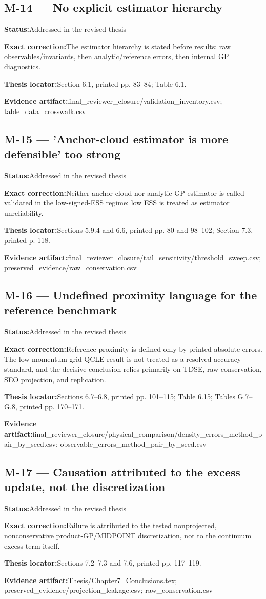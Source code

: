 \documentclass[11pt]{article}
\newcommand{\field}[2]{\textbf{#1}\quad #2\par}
\begin{document}
\subsection*{M-14 --- No explicit estimator hierarchy}
\field{Status:}{Addressed in the revised thesis}
\field{Exact correction:}{The estimator hierarchy is stated before results: raw observables/invariants, then analytic/reference errors, then internal GP diagnostics.}
\field{Thesis locator:}{Section 6.1, printed pp. 83--84; Table 6.1.}
\field{Evidence artifact:}{final\_reviewer\_closure/validation\_inventory.csv; table\_data\_crosswalk.csv}
\subsection*{M-15 --- 'Anchor-cloud estimator is more defensible' too strong}
\field{Status:}{Addressed in the revised thesis}
\field{Exact correction:}{Neither anchor-cloud nor analytic-GP estimator is called validated in the low-signed-ESS regime; low ESS is treated as estimator unreliability.}
\field{Thesis locator:}{Sections 5.9.4 and 6.6, printed pp. 80 and 98--102; Section 7.3, printed p. 118.}
\field{Evidence artifact:}{final\_reviewer\_closure/tail\_sensitivity/threshold\_sweep.csv; preserved\_evidence/raw\_conservation.csv}
\subsection*{M-16 --- Undefined proximity language for the reference benchmark}
\field{Status:}{Addressed in the revised thesis}
\field{Exact correction:}{Reference proximity is defined only by printed absolute errors. The low-momentum grid-QCLE result is not treated as a resolved accuracy standard, and the decisive conclusion relies primarily on TDSE, raw conservation, SEO projection, and replication.}
\field{Thesis locator:}{Sections 6.7--6.8, printed pp. 101--115; Table 6.15; Tables G.7--G.8, printed pp. 170--171.}
\field{Evidence artifact:}{final\_reviewer\_closure/physical\_comparison/density\_errors\_method\_pair\_by\_seed.csv; observable\_errors\_method\_pair\_by\_seed.csv}
\subsection*{M-17 --- Causation attributed to the excess update, not the discretization}
\field{Status:}{Addressed in the revised thesis}
\field{Exact correction:}{Failure is attributed to the tested nonprojected, nonconservative product-GP/MIDPOINT discretization, not to the continuum excess term itself.}
\field{Thesis locator:}{Sections 7.2--7.3 and 7.6, printed pp. 117--119.}
\field{Evidence artifact:}{Thesis/Chapter7\_Conclusions.tex; preserved\_evidence/projection\_leakage.csv; raw\_conservation.csv}
\end{document}
